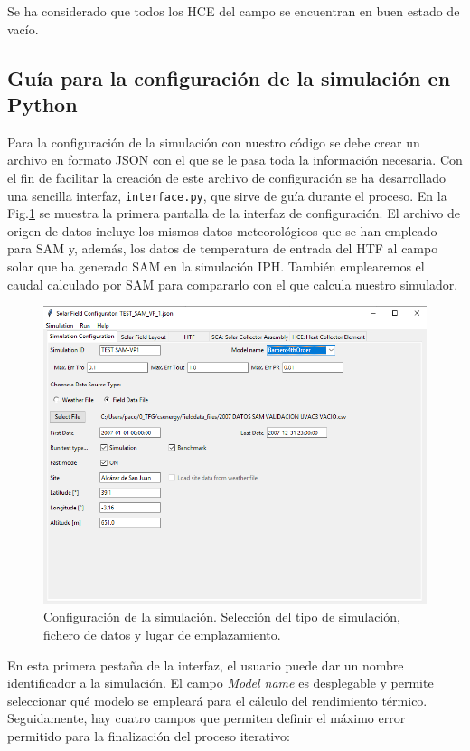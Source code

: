 Se ha considerado que todos los HCE  del campo se encuentran en buen estado de vacío.

\subsection{Guía para la configuración de la simulación en Python}
Para la configuración de la simulación con nuestro código se debe crear un archivo en formato JSON con el que se le pasa toda la información necesaria. Con el fin de facilitar la creación de este archivo de configuración se ha desarrollado una sencilla interfaz, \texttt{interface.py}, que sirve de guía durante el proceso. En la Fig.\ref{fig:interface01} se muestra la primera pantalla de la interfaz de configuración. El archivo de origen de datos incluye los mismos datos meteorológicos que se han empleado para SAM y, además, los datos de temperatura de entrada del HTF al campo solar que ha generado SAM en la simulación IPH. También emplearemos el caudal calculado por SAM para compararlo con el que calcula nuestro simulador.

\begin{figure}[H]
\includegraphics[width=0.9\linewidth]{images/interface01.png}
\caption[Configuración del tipo de simulación]{Configuración de la simulación. Selección del tipo de simulación, fichero de datos y lugar de emplazamiento.} 
\label{fig:interface01}
\end{figure}

En esta primera pestaña de la interfaz, el usuario puede dar un nombre identificador a la simulación. El campo \emph{Model name} es desplegable y permite seleccionar qué modelo se empleará para el cálculo del rendimiento térmico. Seguidamente, hay cuatro campos que permiten definir el máximo error permitido para la finalización del proceso iterativo:

